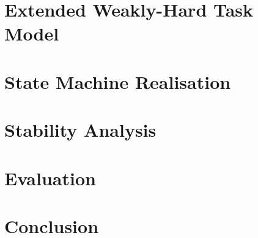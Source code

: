 \documentclass[lettersize,journal]{IEEEtran}
\begin{document}
\section{Extended Weakly-Hard Task Model}
\label{sec:model}


\section{State Machine Realisation}
\label{sec:state-machine}


\section{Stability Analysis}
\label{sec:stability}


\section{Evaluation}
\label{sec:evaluation}


\section{Conclusion}
\label{sec:conclusion}


\balance


\end{document}
